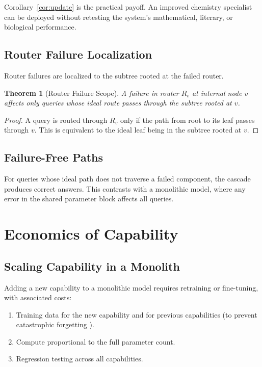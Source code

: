 \documentclass[11pt,a4paper]{article}
\newtheorem{theorem}{Theorem}[section]
\theoremstyle{definition}
\theoremstyle{remark}
\begin{document}
Corollary~\ref{cor:update} is the practical payoff. An improved chemistry specialist can be deployed without retesting the system's mathematical, literary, or biological performance.

\subsection{Router Failure Localization}

Router failures are localized to the subtree rooted at the failed router.

\begin{theorem}[Router Failure Scope]
\label{thm:router-fail}
A failure in router $R_v$ at internal node $v$ affects only queries whose ideal route passes through the subtree rooted at $v$.
\end{theorem}

\begin{proof}
A query is routed through $R_v$ only if the path from root to its leaf passes through $v$. This is equivalent to the ideal leaf being in the subtree rooted at $v$.
\end{proof}

\subsection{Failure-Free Paths}

For queries whose ideal path does not traverse a failed component, the cascade produces correct answers. This contrasts with a monolithic model, where any error in the shared parameter block affects all queries.

\section{Economics of Capability}
\label{sec:economics}

\subsection{Scaling Capability in a Monolith}

Adding a new capability to a monolithic model requires retraining or fine-tuning, with associated costs:
\begin{enumerate}
    \item Training data for the new capability and for previous capabilities (to prevent catastrophic forgetting \citep{kirkpatrick2017overcoming}).
    \item Compute proportional to the full parameter count.
    \item Regression testing across all capabilities.
\end{enumerate}
\end{document}
